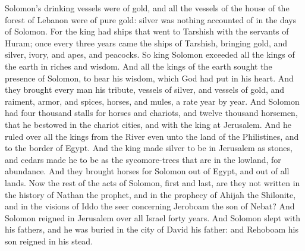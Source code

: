 Solomon’s drinking vessels were of gold, and all the vessels of the house of the forest of Lebanon were of pure gold: silver was nothing accounted of in the days of Solomon. For the king had ships that went to Tarshish with the servants of Huram; once every three years came the ships of Tarshish, bringing gold, and silver, ivory, and apes, and peacocks.  So king Solomon exceeded all the kings of the earth in riches and wisdom. And all the kings of the earth sought the presence of Solomon, to hear his wisdom, which God had put in his heart. And they brought every man his tribute, vessels of silver, and vessels of gold, and raiment, armor, and spices, horses, and mules, a rate year by year. And Solomon had four thousand stalls for horses and chariots, and twelve thousand horsemen, that he bestowed in the chariot cities, and with the king at Jerusalem. And he ruled over all the kings from the River even unto the land of the Philistines, and to the border of Egypt. And the king made silver to be in Jerusalem as stones, and cedars made he to be as the sycomore-trees that are in the lowland, for abundance. And they brought horses for Solomon out of Egypt, and out of all lands.  Now the rest of the acts of Solomon, first and last, are they not written in the history of Nathan the prophet, and in the prophecy of Ahijah the Shilonite, and in the visions of Iddo the seer concerning Jeroboam the son of Nebat? And Solomon reigned in Jerusalem over all Israel forty years. And Solomon slept with his fathers, and he was buried in the city of David his father: and Rehoboam his son reigned in his stead. 

